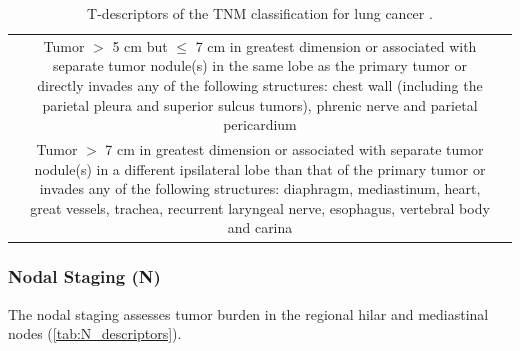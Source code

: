 \begin{table}[ht]
{\begin{tabular}{lcp{18cm}}
\rowcolor[HTML]{FFFFFF} 
    \multicolumn{2}{l}{\cellcolor[HTML]{FFFFFF}\textbf{T3}} & Tumor $>$ 5 cm but $\le$ 7 cm in greatest dimension or associated with separate tumor nodule(s) in the same lobe as the primary tumor or directly invades any of the following structures: chest wall (including the parietal pleura and superior sulcus tumors), phrenic nerve and parietal pericardium \\
\rowcolor[HTML]{EFEFEF}
    \multicolumn{2}{l}{\cellcolor[HTML]{EFEFEF}\textbf{T4}} & Tumor $>$ 7 cm in greatest dimension or associated with separate tumor nodule(s) in a different ipsilateral lobe than that of the primary tumor or invades any of the following structures: diaphragm, mediastinum, heart, great vessels, trachea, recurrent laryngeal nerve, esophagus, vertebral body and carina
\end{tabular}}
\caption{T-descriptors of the TNM classification for lung cancer \cite{TNM_proposal}.}
\label{tab:T_descriptors}
\end{table}

\subsubsection{Nodal Staging (N)}

The nodal staging assesses tumor burden in the regional hilar and mediastinal nodes (\autoref{tab:N_descriptors}).

\begin{table}[ht]
\centering
{}
\caption{N-descriptors of the TNM classification for lung cancer \cite{TNM_proposal}.}
\label{tab:N_descriptors}
\end{table}

